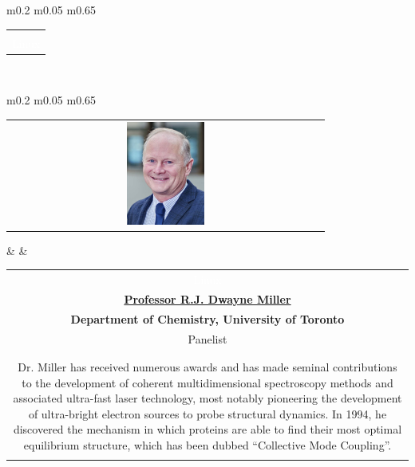 \documentclass[titlepage,oneside,openany,10pt]{book}
\begin{document}
\begin{tabular}{  m{0.2\textwidth}  m{0.05\textwidth}  m{0.65\textwidth}  }
\begin{tabular}[c]{@{}c@{}}
\begin{tabularx}{\linewidth}{@{}XXX@{}}
\qquad At the Graduate Centre for Academic Communication, Dr. Coll leads workshops about graduate-level writing processes and courses on Writing NSERC Proposals and Thesis-Writing in the Physical and Life Sciences.\\
\textcolor{white}{Linux}
\end{tabularx}
\end{tabular}\\
\bottomrule
\end{tabular}

\begin{tabular}{  m{0.2\textwidth}  m{0.05\textwidth}  m{0.65\textwidth}  }
\toprule
\begin{tabular}[c]{@{}c@{}} 
\includegraphics[width=0.25\textwidth]{Other_Figures/DMill.png} 
\end{tabular}		& 		
& \begin{tabular}[c]{@{}c@{}}
\textcolor{white}{Linux}\\
\textbf{\underline{Professor R.J. Dwayne Miller}}\\
\textbf{Department of Chemistry, University of Toronto}\\
Panelist\\\\
\begin{tabularx}{\linewidth}{@{}XXX@{}}
Dr. Dwayne Miller is a professor of Chemistry and Physics at the University of Toronto. His group is engaged in a broad range of research topics that are interrelated by the overarching goal of resolving structure-function relationship of biological systems. Over the years, the Miller group has developed a variety of different technologies, including new laser technology to access different wavelength and temporal regimes.\\
\qquad Dr. Miller has received numerous awards and has made seminal contributions to the development of coherent multidimensional spectroscopy methods and associated ultra-fast laser technology, most notably pioneering the development of ultra-bright electron sources to probe structural dynamics. In 1994, he discovered the mechanism in which proteins are able to find their most optimal equilibrium structure, which has been dubbed ``Collective Mode Coupling''.\\

\end{tabularx}
\end{tabular}
\end{tabular}
\end{document}
